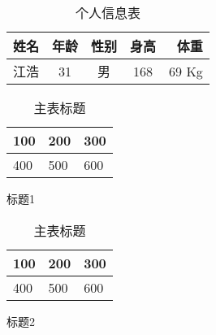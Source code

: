 \documentclass{ctexart}
\begin{document}
% 
\begin{table}
    \centering
    \begin{tabular}{|p{2.5cm \c}| c | c | c | r|}
        \hline
        姓名 & 年龄 & 性别 & 身高 & 体重 \\
        \hline
        \hline
        江浩 & 31  &  男 & 168 & 69 Kg\\
        \hline
    \end{tabular}
    \caption{个人信息表}
\end{table}


\begin{table}	
	\centering
	\begin{subtable}[t]{2in}
		\centering
		\begin{tabular}{|l|l|l|}
		\hline
		100 & 200 & 300\\
		\hline
		400 & 500 & 600\\
		\hline
		\end{tabular}
		\caption{标题1}\label{table:1a}
	\end{subtable}
	\quad
	\begin{subtable}[t]{2in}
		\centering
		\begin{tabular}{|l|l|l|}
		\hline
		100 & 200 & 300\\
		\hline
		400 & 500 & 600\\
		\hline
		\end{tabular}
		\caption{标题2}\label{table:1b}
	\end{subtable}
	\caption{主表标题}\label{table:1}
\end{table}
\end{document}
